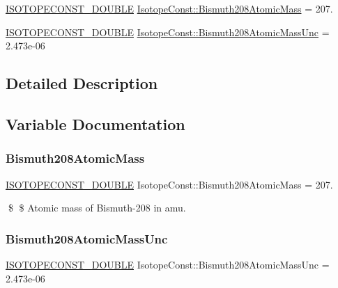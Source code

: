 \begin{DoxyCompactItemize}
\item 
\mbox{\hyperlink{group___isotope_const-_macros_ga8f45a7272ce02c0b4c65c44636ed719a}{I\+S\+O\+T\+O\+P\+E\+C\+O\+N\+S\+T\+\_\+\+D\+O\+U\+B\+LE}} \mbox{\hyperlink{group___isotope_const-_bismuth-_bi208_ga260449bef99cce891f9214da8357cd30}{Isotope\+Const\+::\+Bismuth208\+Atomic\+Mass}} = 207.
\item 
\mbox{\hyperlink{group___isotope_const-_macros_ga8f45a7272ce02c0b4c65c44636ed719a}{I\+S\+O\+T\+O\+P\+E\+C\+O\+N\+S\+T\+\_\+\+D\+O\+U\+B\+LE}} \mbox{\hyperlink{group___isotope_const-_bismuth-_bi208_ga714c7b13ae8773795bf3d8888eb45485}{Isotope\+Const\+::\+Bismuth208\+Atomic\+Mass\+Unc}} = 2.\+473e-\/06
\end{DoxyCompactItemize}


\subsection{Detailed Description}


\subsection{Variable Documentation}
\mbox{\label{group___isotope_const-_bismuth-_bi208_ga260449bef99cce891f9214da8357cd30}} 
\subsubsection{\texorpdfstring{Bismuth208\+Atomic\+Mass}{Bismuth208AtomicMass}}
{\footnotesize\ttfamily \mbox{\hyperlink{group___isotope_const-_macros_ga8f45a7272ce02c0b4c65c44636ed719a}{I\+S\+O\+T\+O\+P\+E\+C\+O\+N\+S\+T\+\_\+\+D\+O\+U\+B\+LE}} Isotope\+Const\+::\+Bismuth208\+Atomic\+Mass = 207.}

\$ \$ Atomic mass of Bismuth-\/208 in amu. \mbox{\label{group___isotope_const-_bismuth-_bi208_ga714c7b13ae8773795bf3d8888eb45485}} 
\subsubsection{\texorpdfstring{Bismuth208\+Atomic\+Mass\+Unc}{Bismuth208AtomicMassUnc}}
{\footnotesize\ttfamily \mbox{\hyperlink{group___isotope_const-_macros_ga8f45a7272ce02c0b4c65c44636ed719a}{I\+S\+O\+T\+O\+P\+E\+C\+O\+N\+S\+T\+\_\+\+D\+O\+U\+B\+LE}} Isotope\+Const\+::\+Bismuth208\+Atomic\+Mass\+Unc = 2.\+473e-\/06}

